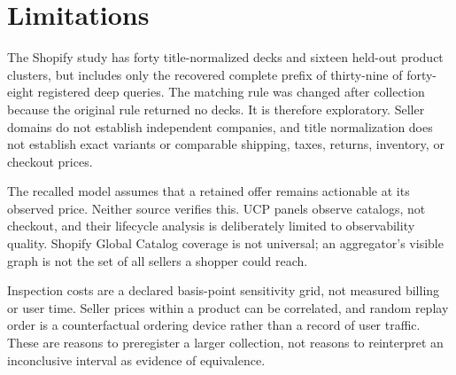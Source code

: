 \section{Limitations}
\label{sec:limitations}

The Shopify study has forty title-normalized decks and sixteen held-out product
clusters, but includes only the recovered complete prefix of thirty-nine of forty-eight
registered deep queries. The matching rule was changed after collection because the
original rule returned no decks. It is therefore exploratory. Seller domains do not
establish independent companies, and title normalization does not establish exact
variants or comparable shipping, taxes, returns, inventory, or checkout prices.

The recalled model assumes that a retained offer remains actionable at its observed
price. Neither source verifies this. UCP panels observe catalogs, not checkout, and
their lifecycle analysis is deliberately limited to observability quality. Shopify
Global Catalog coverage is not universal; an aggregator's visible graph is not the
set of all sellers a shopper could reach.

Inspection costs are a declared basis-point sensitivity grid, not measured billing or
user time. Seller prices within a product can be correlated, and random replay order
is a counterfactual ordering device rather than a record of user traffic. These are
reasons to preregister a larger collection, not reasons to reinterpret an inconclusive
interval as evidence of equivalence.